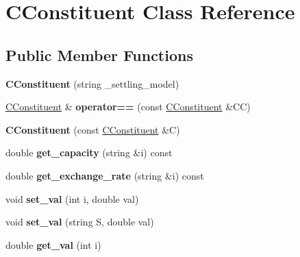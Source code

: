 \hypertarget{class_c_constituent}{}\section{C\+Constituent Class Reference}
\label{class_c_constituent}
\subsection*{Public Member Functions}
\begin{DoxyCompactItemize}
\item 
\mbox{\label{class_c_constituent_a6c4abea04fdc0b4d677afe5021ab401b}} 
{\bfseries C\+Constituent} (string \+\_\+settling\+\_\+model)
\item 
\mbox{\label{class_c_constituent_a3cb419348928d7cfc359330e2580de47}} 
\hyperlink{class_c_constituent}{C\+Constituent} \& {\bfseries operator==} (const \hyperlink{class_c_constituent}{C\+Constituent} \&CC)
\item 
\mbox{\label{class_c_constituent_a145c751fb27025ad9286c2dda4a912f2}} 
{\bfseries C\+Constituent} (const \hyperlink{class_c_constituent}{C\+Constituent} \&C)
\item 
\mbox{\label{class_c_constituent_a4ad288a55d7dee009c436fffc2f733a1}} 
double {\bfseries get\+\_\+capacity} (string \&i) const
\item 
\mbox{\label{class_c_constituent_ad4bc17fe7ae414720f49f572f1e61dbb}} 
double {\bfseries get\+\_\+exchange\+\_\+rate} (string \&i) const
\item 
\mbox{\label{class_c_constituent_a523b6fd16f583b4f2772179939cba671}} 
void {\bfseries set\+\_\+val} (int i, double val)
\item 
\mbox{\label{class_c_constituent_a39ed28e38de6852561b71599aca474bf}} 
void {\bfseries set\+\_\+val} (string S, double val)
\item 
\mbox{\label{class_c_constituent_a2f3888ea02d98babfa8281af565ee436}} 
double {\bfseries get\+\_\+val} (int i)
\end{DoxyCompactItemize}
